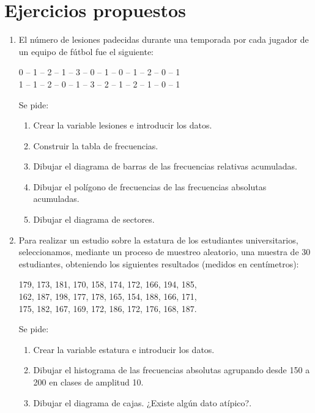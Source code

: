 \section{Ejercicios propuestos}
\begin{enumerate}[leftmargin=*]
\item  El número de lesiones padecidas durante una temporada por cada jugador de un equipo de fútbol fue el siguiente:
\begin{center}
0 -- 1 -- 2 -- 1 -- 3 -- 0 -- 1 -- 0 -- 1 -- 2 -- 0 -- 1 \\
1 -- 1 -- 2 -- 0 -- 1 -- 3 -- 2 -- 1 -- 2 -- 1 -- 0 -- 1
\end{center}

Se pide:
\begin{enumerate}
\item Crear la variable lesiones e introducir los datos.
\item Construir la tabla de frecuencias.
\item Dibujar el diagrama de barras de las frecuencias relativas acumuladas.
\item Dibujar el polígono de frecuencias de las frecuencias absolutas acumuladas.
\item Dibujar el diagrama de sectores.
\end{enumerate}


\item Para realizar un estudio sobre la estatura de los estudiantes universitarios, seleccionamos, mediante un proceso de muestreo aleatorio, una muestra de 30 estudiantes, obteniendo los siguientes resultados (medidos en centímetros):
\begin{center}
179, 173, 181, 170, 158, 174, 172, 166, 194, 185,\\
162, 187, 198, 177, 178, 165, 154, 188, 166, 171,\\
175, 182, 167, 169, 172, 186, 172, 176, 168, 187.
\end{center}

Se pide:
\begin{enumerate}
\item  Crear la variable estatura e introducir los datos.
\item  Dibujar el histograma de las frecuencias absolutas agrupando desde 150 a 200 en clases de amplitud 10.
\item  Dibujar el diagrama de cajas. ¿Existe algún dato atípico?.
\end{enumerate}

\end{enumerate}
